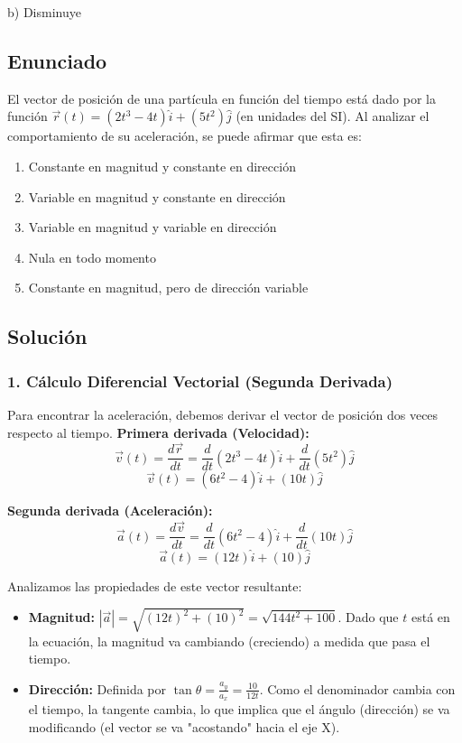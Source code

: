 \documentclass[12pt, a4paper]{article}
\begin{document}
\begin{tcolorbox}[colback=green!5!white, colframe=green!50!black, title=Respuesta Final]
\centering \Large b) Disminuye
\end{tcolorbox}

\newpage

\subsection*{Enunciado}
El vector de posición de una partícula en función del tiempo está dado por la función $\vec{r}(t) = (2t^3 - 4t)\hat{i} + (5t^2)\hat{j}$ (en unidades del SI). Al analizar el comportamiento de su aceleración, se puede afirmar que esta es:
\begin{enumerate}[label=\alph*)]
    \item Constante en magnitud y constante en dirección
    \item Variable en magnitud y constante en dirección
    \item Variable en magnitud y variable en dirección
    \item Nula en todo momento
    \item Constante en magnitud, pero de dirección variable
\end{enumerate}

\subsection*{Solución}

\subsubsection*{1. Cálculo Diferencial Vectorial (Segunda Derivada)}
Para encontrar la aceleración, debemos derivar el vector de posición dos veces respecto al tiempo.
\textbf{Primera derivada (Velocidad):}
$$ \vec{v}(t) = \frac{d\vec{r}}{dt} = \frac{d}{dt}(2t^3 - 4t)\hat{i} + \frac{d}{dt}(5t^2)\hat{j} $$
$$ \vec{v}(t) = (6t^2 - 4)\hat{i} + (10t)\hat{j} $$

\textbf{Segunda derivada (Aceleración):}
$$ \vec{a}(t) = \frac{d\vec{v}}{dt} = \frac{d}{dt}(6t^2 - 4)\hat{i} + \frac{d}{dt}(10t)\hat{j} $$
$$ \vec{a}(t) = (12t)\hat{i} + (10)\hat{j} $$

Analizamos las propiedades de este vector resultante:
\begin{itemize}
    \item \textbf{Magnitud:} $|\vec{a}| = \sqrt{(12t)^2 + (10)^2} = \sqrt{144t^2 + 100}$. Dado que $t$ está en la ecuación, la magnitud va cambiando (creciendo) a medida que pasa el tiempo.
    \item \textbf{Dirección:} Definida por $\tan\theta = \frac{a_y}{a_x} = \frac{10}{12t}$. Como el denominador cambia con el tiempo, la tangente cambia, lo que implica que el ángulo (dirección) se va modificando (el vector se va "acostando" hacia el eje X).
\end{itemize}
\end{document}
